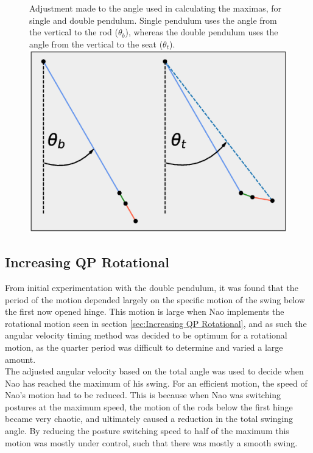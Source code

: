 \documentclass[11pt]{article}
\begin{document}
    \begin{figure}[!htb]
        \centering
        \captionbox
             {Adjustment made to the angle used in calculating the maximas, for single and double pendulum. Single pendulum uses the angle from the vertical to the rod ($\theta_b$), whereas the double pendulum uses the angle from the vertical to the seat ($\theta_t$). \label{fig:TotalAngleDiagram}}
             {\includegraphics[width=1.0\textwidth]{TotalAngleDiagram.eps}}
    \end{figure}
    
\clearpage

\subsection{Increasing QP Rotational}
From initial experimentation with the double pendulum, it was found that the period of the motion depended largely on the specific motion of the swing below the first now opened hinge. This motion is large when Nao implements the rotational motion seen in section \ref{sec:Increasing QP Rotational}, and as such the angular velocity timing method was decided to be optimum for a rotational motion, as the quarter period was difficult to determine and varied a large amount.\\

The adjusted angular velocity based on the total angle was used to decide when Nao has reached the maximum of his swing. For an efficient motion, the speed of Nao's motion had to be reduced. This is because when Nao was switching postures at the maximum speed, the motion of the rods below the first hinge became very chaotic, and ultimately caused a reduction in the total swinging angle. By reducing the posture switching speed to half of the maximum this motion was mostly under control, such that there was mostly a smooth swing.\\
\end{document}
